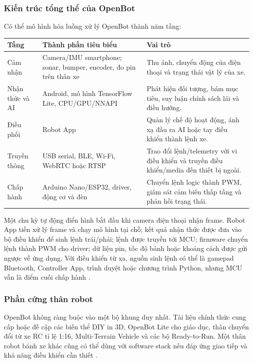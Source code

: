 \subsubsection{Kiến trúc tổng thể của OpenBot}

Có thể mô hình hóa luồng xử lý OpenBot thành năm tầng:

\begin{center}
\begin{tabularx}{\textwidth}{|p{2.5cm}|p{3.8cm}|X|}
\hline
\textbf{Tầng} & \textbf{Thành phần tiêu biểu} & \textbf{Vai trò} \\
\hline
Cảm nhận & Camera/IMU smartphone; sonar, bumper, encoder, đo pin trên thân xe & Thu ảnh, chuyển động của điện thoại và trạng thái vật lý của xe. \\
\hline
Nhận thức và AI & Android, mô hình TensorFlow Lite, CPU/GPU/NNAPI & Phát hiện đối tượng, bám mục tiêu, suy luận chính sách lái và điều hướng. \\
\hline
Điều phối & Robot App & Quản lý chế độ hoạt động, ánh xạ đầu ra AI hoặc tay điều khiển thành lệnh xe. \\
\hline
Truyền thông & USB serial, BLE, Wi-Fi, WebRTC hoặc RTSP & Trao đổi lệnh/telemetry với vi điều khiển và truyền điều khiển/media đến thiết bị ngoài. \\
\hline
Chấp hành & Arduino Nano/ESP32, driver, động cơ và đèn & Chuyển lệnh logic thành PWM, giám sát cảm biến thấp tầng và phản hồi trạng thái. \\
\hline
\end{tabularx}
\end{center}

Một chu kỳ tự động điển hình bắt đầu khi camera điện thoại nhận frame. Robot App tiền xử lý frame và chạy mô hình tại chỗ; kết quả nhận thức được đưa vào bộ điều khiển để sinh lệnh trái/phải; lệnh được truyền tới MCU; firmware chuyển lệnh thành PWM cho driver; dữ liệu pin, tốc độ bánh hoặc khoảng cách được gửi ngược về ứng dụng. Với điều khiển từ xa, nguồn sinh lệnh có thể là gamepad Bluetooth, Controller App, trình duyệt hoặc chương trình Python, nhưng MCU vẫn là điểm cuối chấp hành .

\subsubsection{Phần cứng thân robot}

OpenBot không ràng buộc vào một bộ khung duy nhất. Tài liệu chính thức cung cấp hoặc đề cập các biến thể DIY in 3D, OpenBot Lite cho giáo dục, thân chuyển đổi từ xe RC tỉ lệ 1:16, Multi-Terrain Vehicle và các bộ Ready-to-Run. Một thân robot bánh xe khác cũng có thể dùng với software stack nếu đáp ứng giao tiếp và khả năng điều khiển cần thiết .


